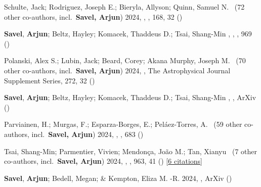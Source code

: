 \item[{\color{numcolor}\scriptsize52}] Schulte, Jack; Rodriguez, Joseph E.; Bieryla, Allyson; Quinn, Samuel N. \etal\ ({72} other co-authors, incl.\ \textbf{Savel, Arjun}) 2024, , \aj, {168}, 32 ()

\item[{\color{numcolor}\scriptsize51}] \textbf{Savel}, \textbf{Arjun}; Beltz, Hayley; Komacek, Thaddeus D.; Tsai, Shang-Min , , \apj, {969} ()

\item[{\color{numcolor}\scriptsize50}] Polanski, Alex S.; Lubin, Jack; Beard, Corey; Akana Murphy, Joseph M. \etal\ ({70} other co-authors, incl.\ \textbf{Savel, Arjun}) 2024, , The Astrophysical Journal Supplement Series, {272}, 32 ()

\item[{\color{numcolor}\scriptsize49}] \textbf{Savel}, \textbf{Arjun}; Beltz, Hayley; Komacek, Thaddeus D.; Tsai, Shang-Min , , ArXiv ()

\item[{\color{numcolor}\scriptsize48}] Parviainen, H.; Murgas, F.; Esparza-Borges, E.; Pel{\'a}ez-Torres, A. \etal\ ({59} other co-authors, incl.\ \textbf{Savel, Arjun}) 2024, , \aanda, {683} ()

\item[{\color{numcolor}\scriptsize47}] Tsai, Shang-Min; Parmentier, Vivien; Mendon{\c{c}}a, Jo{\~a}o M.; Tan, Xianyu \etal\ ({7} other co-authors, incl.\ \textbf{Savel, Arjun}) 2024, , \apj, {963}, 41 () [\href{https://ui.adsabs.harvard.edu/abs/2024ApJ...963...41T}{6 citations}]

\item[{\color{numcolor}\scriptsize46}] \textbf{Savel}, \textbf{Arjun}; Bedell, Megan; \& Kempton, Eliza M. -R. 2024, , ArXiv ()

